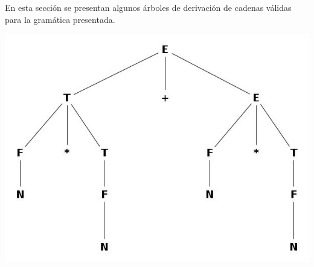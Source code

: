 En esta secci\'on se presentan algunos \'arboles de derivaci\'on de cadenas v\'alidas para la gram\'atica presentada.

\centerline{\includegraphics[scale=0.40]{arboles_derivacion/ejemplo2.jpg}}
\newpage

